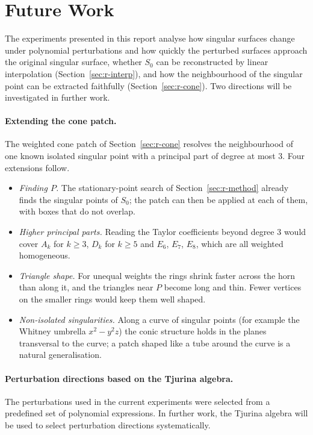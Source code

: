 \documentclass[12pt, a4paper]{article}
\theoremstyle{plain}
\theoremstyle{definition}
\theoremstyle{remark}
\theoremstyle{definition}
\begin{document}
\section{Future Work}
\label{sec:future-work}

The experiments presented in this report analyse how singular
surfaces change under polynomial perturbations and how quickly
the perturbed surfaces approach the original singular surface, whether $S_0$ can be
reconstructed by linear interpolation (Section~\ref{sec:r-interp}), and how the
neighbourhood of the singular point can be extracted faithfully
(Section~\ref{sec:r-cone}). Two directions will be investigated in further work.

\paragraph{Extending the cone patch.} The weighted cone patch of
Section~\ref{sec:r-cone} resolves the neighbourhood of one known isolated singular
point with a principal part of degree at most $3$. Four extensions follow.
\begin{itemize}
    \item \emph{Finding $P$.} The stationary-point search of
          Section~\ref{sec:r-method} already finds the singular points of $S_0$;
          the patch can then be applied at each of them, with boxes that do not
          overlap.
    \item \emph{Higher principal parts.} Reading the Taylor coefficients beyond
          degree $3$ would cover $A_k$ for $k\ge3$, $D_k$ for $k\ge5$ and $E_6$,
          $E_7$, $E_8$, which are all weighted homogeneous.
    \item \emph{Triangle shape.} For unequal weights the rings shrink faster
          across the horn than along it, and the triangles near $P$ become long and
          thin. Fewer vertices on the smaller rings would keep them well shaped.
    \item \emph{Non-isolated singularities.} Along a curve of singular points
          (for example the Whitney umbrella $x^2-y^2z$) the conic structure holds
          in the planes transversal to the curve; a patch shaped like a tube
          around the curve is a natural generalisation.
\end{itemize}

\paragraph{Perturbation directions based on the Tjurina algebra.}
The perturbations used in the current experiments were selected
from a predefined set of polynomial expressions. In further
work, the Tjurina algebra will be used to select perturbation
directions systematically.
\end{document}
